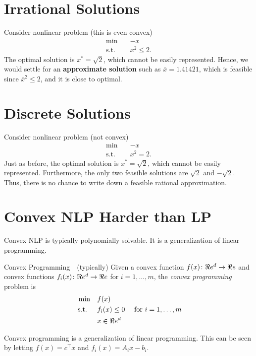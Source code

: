 \section{Irrational Solutions}
Consider nonlinear problem (this  is even convex)
\begin{equation}
\begin{array}{rl}
\min \quad & -x\\
\text{s.t.} \quad & x^2 \leq 2.
\end{array}
\end{equation}
The optimal solution is $x^* = \sqrt{2}$, which cannot be easily represented.  Hence, we would settle for an \textbf{approximate solution} such as $\bar x = 1.41421$, which is feasible since $\bar x^2 \leq 2$, and it is close to optimal.

\section{Discrete Solutions}
Consider nonlinear problem (not convex)
\begin{equation}
\begin{array}{rl}
\min \quad & -x\\
\text{s.t.} \quad & x^2 = 2.
\end{array}
\end{equation}
Just as before, the optimal solution is $x^* = \sqrt{2}$, which cannot be easily represented.  Furthermore, the only two feasible solutions are $\sqrt{2}$ and $-\sqrt{2}$.  Thus, there is no chance to write down a feasible rational approximation.

\section{Convex NLP Harder than LP}
Convex NLP is typically polynomially solvable.  It is a generalization of linear programming.  
\begin{general}{Convex Programming}{\polynomial\ \  (typically)}
Given a convex function $f(x)\colon \Re e^d \to \Re e$ and convex functions $f_i(x)\colon \Re e^d \to \Re e$ for $i=1, \dots, m$,  the \emph{convex programming} problem is
\begin{equation}
\label{eq:convex-programming}
\begin{split}
\min \quad & f(x)\\
\mbox{ s.t. }  \quad & f_i(x) \leq 0  \quad  \mbox{ for } i=1, \dots, m\\
& x \in \Re e^d
\end{split}
\end{equation}
\end{general}
\begin{example}
Convex programming is a generalization of linear programming.  This can be seen by letting $f(x) = c^\top x$ and $f_i(x) = A_i x - b_i$.  
\end{example}


